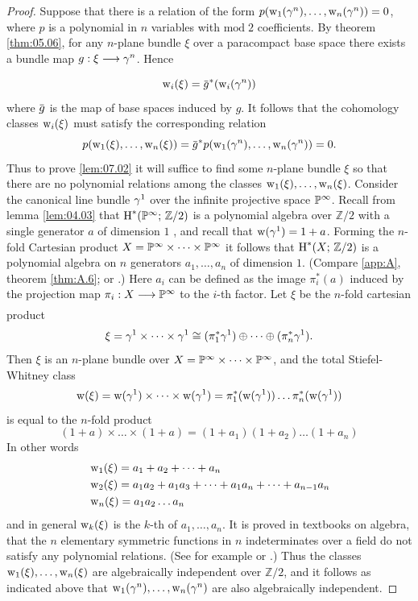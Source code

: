 \documentclass[../main]{subfiles}
\begin{document}
\begin{proof}
Suppose that there is a relation of the form $p(\operatorname{w}_{1}(\gamma^{n}), \dots,\operatorname{w}_{n}(\gamma^{n}))=0$, where $p$ is a polynomial in $n$ variables with $\mathrm{mod}\; 2$ coefficients. By theorem \ref{thm:05.06}, for any $n$-plane bundle $\xi$ over a paracompact base space there exists a bundle map $g:\xi\varrightarrow{} \tautological^n$. Hence
\[\sw_{i}(\xi)=\xoverline{g}^{\ast}(\sw_{i}(\tautological^{n}))\]
where $\xoverline{g}$ is the map of base spaces induced by $g$. It follows that the cohomology classes $\operatorname{w}_{i}(\xi)$ must satisfy the corresponding relation
\[p(\sw_{1}(\xi), \dots, \sw_{n}(\xi))=\xoverline{g}^{\ast} p(\sw_{1}(\tautological^{n}), \dots, \sw_{n}(\tautological^{n}))=0.\]
Thus to prove \ref{lem:07.02} it will suffice to find some $n$-plane bundle $\xi$ so that there are no polynomial relations among the classes $\operatorname{w}_{1}(\xi), \dots, \operatorname{w}_{n}(\xi)$. Consider the canonical line bundle $\gamma^{1}$ over the infinite projective space $\mathbb{P}^\infty $. Recall from lemma \ref{lem:04.03} that $\operatorname{H}^{\ast}(\mathbb{P}^\infty ; \, \mathbb{Z} / 2)$ is a polynomial algebra over $\mathbb{Z} / 2$ with a single generator $a$ of dimension $1$ , and recall that $\operatorname{w}(\gamma^{1})=1+a$. Forming the $n$-fold Cartesian product $X=\mathbb{P}^\infty \times \dots \times \mathbb{P}^\infty$ it follows that $\operatorname{H}^{\ast}(X ; \, \mathbb{Z} / 2)$ is a polynomial algebra on $n$ generators $a_{1}, \dots, a_{n}$ of dimension $1 $. (Compare \ref{app:A}, theorem \ref{thm:A.6}; or \cite[p. 247]{spanier1981}.) Here  $a_{i}$ can be defined as the image $\pi_{i}^{\ast}(a)$ induced by the projection map $\pi_i:X\varrightarrow{} \projective^\infty$ to the $i$-th factor. Let $\xi$ be the $n$-fold cartesian product
\[\xi=\gamma^{1} \times \dots \times \gamma^{1} \cong(\pi_{1}^{\ast} \gamma^{1}) \oplus \dots \oplus(\pi_{n}^{\ast} \gamma^{1}).\]
Then $\xi$ is an $n$-plane bundle over $X=\mathbb{P}^\infty \times \dots \times \mathbb{P}^\infty$, and the total Stiefel-Whitney class
\[
\operatorname{w}(\xi)=\operatorname{w}(\gamma^{1}) \times \dots \times \operatorname{w}(\gamma^{1})=\pi_{1}^{\ast}(\operatorname{w}(\gamma^{1})) \dots \pi_{n}^{\ast}(\operatorname{w}(\gamma^{1}))
\]
is equal to the $n$-fold product
\[
(1+a) \times \dots \times(1+a)=(1+a_{1})(1+a_{2}) \dots(1+a_{n})
\]
In other words
\begin{align*}
	&\operatorname{w}_{1}(\xi)=a_{1}+a_{2}+\dots+a_{n} \\
	&\operatorname{w}_{2}(\xi)=a_{1} a_{2}+a_{1} a_{3}+\dots+a_{1} a_{n}+\dots+a_{n-1} a_{n} \\
	&\operatorname{w}_{n}(\xi)=a_{1} a_{2} \dots a_{n}
\end{align*}
and in general $\operatorname{w}_{k}(\xi)$ is the $k$-th  of $a_{1}, \dots, a_{n} $. It is proved in textbooks on algebra, that the $n$ elementary symmetric functions in $n$ indeterminates over a field do not satisfy any polynomial relations. (See for example \cite[pp 132-134]{lang1965algebra} or \cite[pp. 79,176]{waerden1970}.) Thus the classes $\operatorname{w}_{1}(\xi), \dots, \operatorname{w}_{n}(\xi)$ are algebraically independent over $\mathbb{Z} / 2$, and it follows as indicated above that $\operatorname{w}_{1}(\gamma^{n}), \dots, \operatorname{w}_{n}(\gamma^{n})$ are also algebraically independent.
\end{proof}
\end{document}
